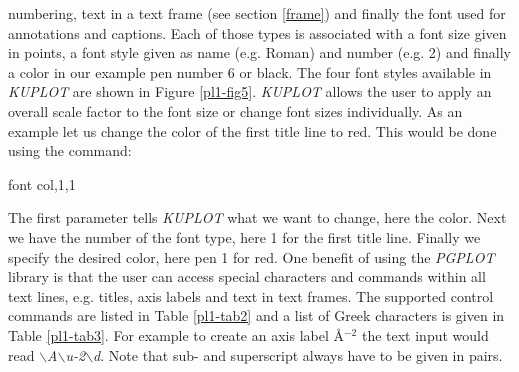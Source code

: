 numbering, text in a text frame (see section \ref{frame}) and
finally the font used for annotations and captions. Each of those
types is associated with a font size given in points, a font style
given as name (e.g. Roman) and number (e.g. 2) and finally a color
in our example pen number 6 or black. The four font styles
available in {\it KUPLOT} are shown in Figure \ref{pl1-fig5}. {\it
KUPLOT} allows the user to apply an overall scale factor to the
font size or change font sizes individually. As an example let us
change the color of the first title line to red. This would be
done using the command:
%
\begin{MacVerbatim}
    font col,1,1
\end{MacVerbatim}
%
The first parameter tells {\it KUPLOT} what we want to change,
here the color. Next we have the number of the font type, here 1
for the first title line. Finally we specify the desired color,
here pen 1 for red. One benefit of using the {\it PGPLOT} library
is that the user can access special characters and commands within
all text lines, e.g. titles, axis labels and text in text frames.
The supported control commands are listed in Table \ref{pl1-tab2}
and a list of Greek characters is given in Table \ref{pl1-tab3}.
For example to create an axis label \AA$^{-2}$ the text input
would read {\it $\backslash$A$\backslash$u-2$\backslash$d}. Note
that sub- and superscript always have to be given in pairs.
%
